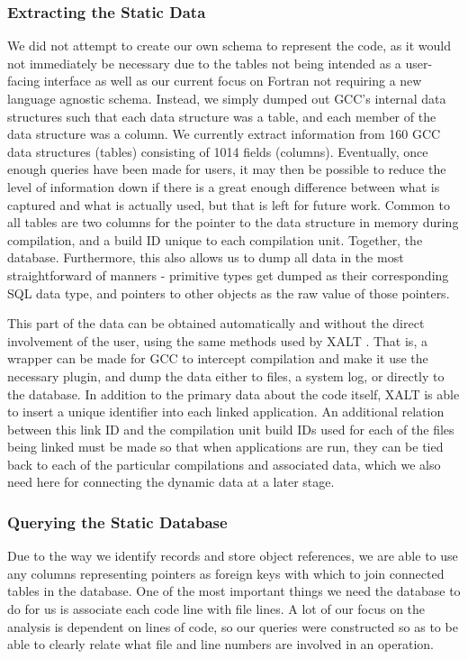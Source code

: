 \subsubsection{Extracting the Static Data}
We did not attempt to create our own schema to represent the code, as it would not immediately be 
necessary due to the tables not being intended as a user-facing interface as well as our current 
focus 
on Fortran not requiring a new language agnostic schema.
Instead, we simply dumped out \acs{GCC}'s internal data structures such that each data structure 
was a table, and each member of the data structure was a column.
We currently extract information from 160 \acs{GCC} data structures (tables) consisting of 1014 
fields (columns).
Eventually, once enough queries have been made for users, it may then be possible to reduce the 
level of information down if there is a great enough difference between what is captured and what is 
actually used, but that is left for future work.
Common to all tables are two columns for the pointer to the data structure in memory during 
compilation, and a build ID unique to each compilation unit.
Together, 
the database.
Furthermore, this also allows us to dump all data in the most straightforward of manners - primitive 
types get dumped as their corresponding \acs{SQL} data type, and pointers to other objects as the 
raw value of those pointers.

This part of the data can be obtained automatically and without the direct involvement of the user, 
using the same methods used by XALT \cite{7081224}.
That is, a wrapper can be made for \acs{GCC} to intercept compilation and make it use the 
necessary 
plugin, and dump the data either to files, a system log, or directly to the database.
In addition to the primary data about the code itself, XALT is able to insert a unique identifier into 
each 
linked application.
An additional relation between this link ID and the compilation unit build IDs used for each of the files 
being linked must be made so that when applications are run, they can be tied back to each of the 
particular compilations and associated data, which we also need here for connecting the dynamic 
data at a later stage.
\subsubsection{Querying the Static Database}
\label{sec:querying}
Due to the way we identify records and store object references, we are able to use any columns 
representing pointers as foreign keys with which to join connected tables in the database.
One of the most important things we need the database to do for us is associate each code line with 
file lines. A lot of our focus on the analysis is dependent on lines of code, so our queries were 
constructed so as to be able to clearly relate what file and line numbers are involved in an operation.

